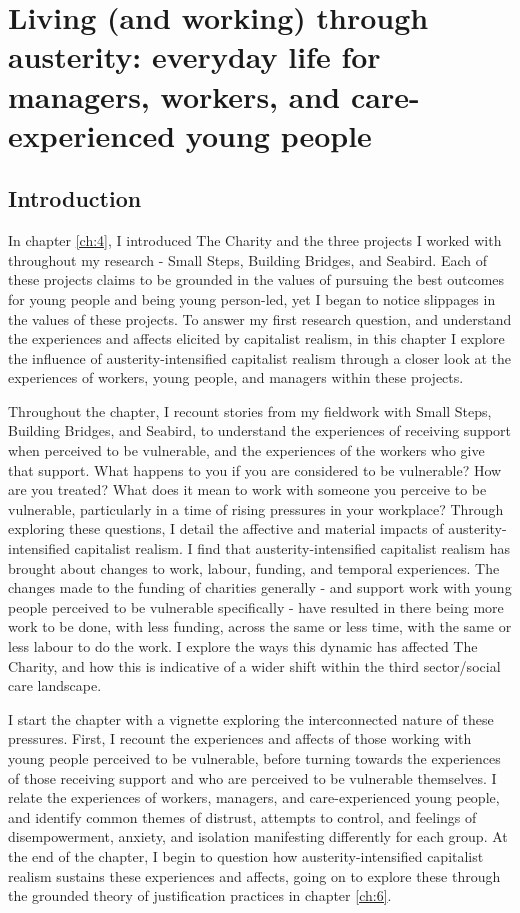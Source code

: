 \chapter{Living (and working) through austerity: everyday life for managers, workers, and care-experienced young people}
\label{ch:5}

\section{Introduction}
\label{sec:5-intro}

In chapter \ref{ch:4}, I introduced The Charity and the three projects I worked with throughout my research - Small Steps, Building Bridges, and Seabird. Each of these projects claims to be grounded in the values of pursuing the best outcomes for young people and being young person-led, yet I began to notice slippages in the values of these projects. To answer my first research question, and understand the experiences and affects elicited by capitalist realism, in this chapter I explore the influence of austerity-intensified capitalist realism through a closer look at the experiences of workers, young people, and managers within these projects.

Throughout the chapter, I recount stories from my fieldwork with Small Steps, Building Bridges, and Seabird, to understand the experiences of receiving support when perceived to be vulnerable, and the experiences of the workers who give that support. What happens to you if you are considered to be vulnerable? How are you treated? What does it mean to work with someone you perceive to be vulnerable, particularly in a time of rising pressures in your workplace? Through exploring these questions, I detail the affective and material impacts of austerity-intensified capitalist realism. I find that austerity-intensified capitalist realism has brought about changes to work, labour, funding, and temporal experiences. The changes made to the funding of charities generally - and support work with young people perceived to be vulnerable specifically - have resulted in there being more work to be done, with less funding, across the same or less time, with the same or less labour to do the work. I explore the ways this dynamic has affected The Charity, and how this is indicative of a wider shift within the third sector/social care landscape. 

I start the chapter with a vignette exploring the interconnected nature of these pressures. First, I recount the experiences and affects of those working with young people perceived to be vulnerable, before turning towards the experiences of those receiving support and who are perceived to be vulnerable themselves. I relate the experiences of workers, managers, and care-experienced young people, and identify common themes of distrust, attempts to control, and feelings of disempowerment, anxiety, and isolation manifesting differently for each group. At the end of the chapter, I begin to question how austerity-intensified capitalist realism sustains these experiences and affects, going on to explore these through the grounded theory of justification practices  in chapter \ref{ch:6}. 

